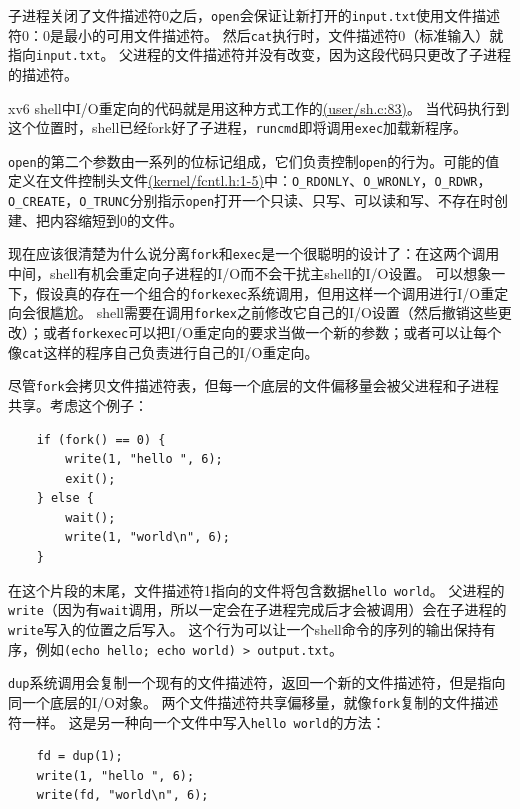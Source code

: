 子进程关闭了文件描述符0之后，\texttt{open}会保证让新打开的\texttt{input.txt}使用文件描述符0：0是最小的可用文件描述符。
然后\texttt{cat}执行时，文件描述符0（标准输入）就指向\texttt{input.txt}。
父进程的文件描述符并没有改变，因为这段代码只更改了子进程的描述符。

xv6 shell中I/O重定向的代码就是用这种方式工作的\href{https://github.com/mit-pdos/xv6-riscv/blob/riscv//user/sh.c#L83}{(user/sh.c:83)}。
当代码执行到这个位置时，shell已经fork好了子进程，\texttt{runcmd}即将调用\texttt{exec}加载新程序。

\texttt{open}的第二个参数由一系列的位标记组成，它们负责控制\texttt{open}的行为。可能的值定义在文件控制头文件\href{https://github.com/mit-pdos/xv6-riscv/blob/riscv//kernel/fcntl.h#L1-L5}{(kernel/fcntl.h:1-5)}中：\texttt{O\_RDONLY}、\texttt{O\_WRONLY}，\texttt{O\_RDWR}，\texttt{O\_CREATE}，\texttt{O\_TRUNC}分别指示\texttt{open}打开一个只读、只写、可以读和写、不存在时创建、把内容缩短到0的文件。

现在应该很清楚为什么说分离\texttt{fork}和\texttt{exec}是一个很聪明的设计了：在这两个调用中间，shell有机会重定向子进程的I/O而不会干扰主shell的I/O设置。
可以想象一下，假设真的存在一个组合的\texttt{forkexec}系统调用，但用这样一个调用进行I/O重定向会很尴尬。
shell需要在调用\texttt{forkex}之前修改它自己的I/O设置（然后撤销这些更改）；或者\texttt{forkexec}可以把I/O重定向的要求当做一个新的参数；或者可以让每个像\texttt{cat}这样的程序自己负责进行自己的I/O重定向。

尽管\texttt{fork}会拷贝文件描述符表，但每一个底层的文件偏移量会被父进程和子进程共享。考虑这个例子：
\begin{lstlisting}
    if (fork() == 0) {
        write(1, "hello ", 6);
        exit();
    } else {
        wait();
        write(1, "world\n", 6);
    }
\end{lstlisting}
在这个片段的末尾，文件描述符1指向的文件将包含数据\texttt{hello world}。
父进程的\texttt{write}（因为有\texttt{wait}调用，所以一定会在子进程完成后才会被调用）会在子进程的\texttt{write}写入的位置之后写入。
这个行为可以让一个shell命令的序列的输出保持有序，例如\texttt{(echo hello; echo world) > output.txt}。

\texttt{dup}系统调用会复制一个现有的文件描述符，返回一个新的文件描述符，但是指向同一个底层的I/O对象。
两个文件描述符共享偏移量，就像\texttt{fork}复制的文件描述符一样。
这是另一种向一个文件中写入\texttt{hello world}的方法：
\begin{lstlisting}
    fd = dup(1);
    write(1, "hello ", 6);
    write(fd, "world\n", 6);
\end{lstlisting}

